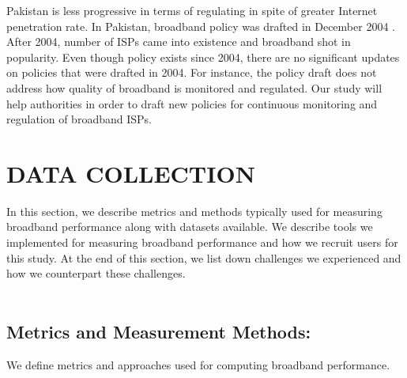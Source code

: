 \documentclass{sig-alternate-10pt}
\begin{document}
\indent Pakistan is less progressive in terms of regulating in spite of greater Internet penetration rate. In Pakistan,  broadband policy was drafted in December 2004 \cite{03}. After 2004, number of ISPs came into existence and broadband shot in popularity. Even though policy exists since 2004, there are no significant updates on policies that were drafted in 2004. For instance, the policy draft does not address how quality of broadband is monitored and regulated. Our study will help authorities in order to draft new policies for continuous monitoring and regulation of broadband ISPs.

\section {DATA COLLECTION}
In this section, we describe metrics and methods typically used for measuring broadband performance along with datasets available. We describe tools we implemented for measuring broadband performance and how we recruit users for this study. At the end of this section, we list down challenges we experienced and how we counterpart these challenges.\\\\
\subsection {Metrics and Measurement Methods:}
We define metrics and approaches used for computing broadband performance.
\end{document}
